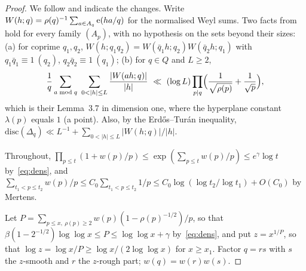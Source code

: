 \documentclass[11pt,a4paper]{article}
\theoremstyle{remark}\newtheorem{remark}[theorem]{Remark}
\begin{document}
\begin{proof}
We follow \cite[\S\S3--4]{KowalskiSoundararajan2021} and indicate the changes. Write
$W(h;q)=\rho(q)^{-1}\sum_{a\in A_q}\mathrm{e}(ha/q)$ for the normalised Weyl sums. Two facts from
\cite[Lemma~3.5, Lemma~3.7]{KowalskiSoundararajan2021} hold for every family $(A_p)$, with no hypothesis on
the sets beyond their sizes: (a) for coprime $q_1,q_2$, $W(h;q_1q_2)=W(\bar q_1h;q_2)W(\bar q_2h;q_1)$ with
$q_1\bar q_1\equiv1\ (q_2)$, $q_2\bar q_2\equiv1\ (q_1)$; (b) for $q\in Q$ and $L\ge2$,
\begin{equation}\label{eq:L37}
\frac1q\sum_{a\bmod q}\ \sum_{0<|h|\le L}\frac{|W(ah;q)|}{|h|}\ \ll\ (\log L)\prod_{p\mid q}\Bigl(\frac1{\sqrt{\rho(p)}}+\frac1{\sqrt p}\Bigr),
\end{equation}
which is their Lemma~3.7 in dimension one, where the hyperplane constant $\lambda(p)$ equals $1$ (a point).
Also, by the Erd\H os--Tur\'an inequality, $\mathrm{disc}(\Delta_q)\ll L^{-1}+\sum_{0<|h|\le L}|W(h;q)|/|h|$.

Throughout, $\prod_{p\le t}(1+w(p)/p)\le\exp(\sum_{p\le t}w(p)/p)\le e^{\gamma}\log t$ by~\eqref{eq:dens}, and
$\sum_{t_1<p\le t_2}w(p)/p\le C_0\sum_{t_1<p\le t_2}1/p\le C_0\log(\log t_2/\log t_1)+O(C_0)$ by Mertens.

Let $P=\sum_{p\le x,\ \rho(p)\ge2}w(p)(1-\rho(p)^{-1/2})/p$, so that $\beta(1-2^{-1/2})\log\log x\le P\le\log\log x+\gamma$
by~\eqref{eq:dens}, and put $z=x^{1/P}$, so that $\log z=\log x/P\ge\log x/(2\log\log x)$ for $x\ge x_1$. Factor
$q=rs$ with $s$ the $z$-smooth and $r$ the $z$-rough part; $w(q)=w(r)w(s)$.


\end{proof}
\end{document}
